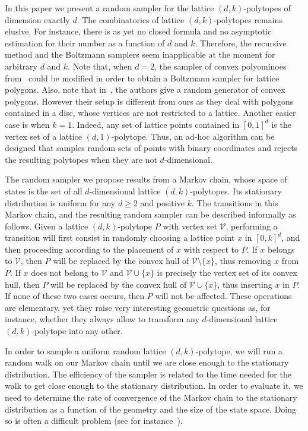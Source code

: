\documentclass[a4paper]{article}
\begin{document}
In this paper we present a random sampler for the lattice $(d,k)$-polytopes of dimension exactly $d$. The combinatorics of lattice $(d,k)$-polytopes remains elusive. For instance, there is as yet no closed formula and no asymptotic estimation for their number as a function of $d$ and $k$. Therefore, the recursive method and the Boltzmann samplers seem inapplicable at the moment for arbitrary $d$ and $k$. Note that, when $d=2$, the sampler of convex polyominoes from~\cite{bodini2013asymptotic} could be modified in order to obtain a Boltzmann sampler for lattice polygons. Also, note that in~\cite{devillers2014generator}, the authors give a random generator of convex polygons. However their setup is different from ours as they deal with polygons contained in a disc, whose vertices are not restricted to a lattice. Another easier case is when $k=1$. Indeed, any set of lattice points contained in $[0,1]^d$ is the vertex set of a lattice $(d,1)$-polytope. Thus, an ad-hoc algorithm can be designed that samples random sets of points with binary coordinates and rejects the resulting polytopes when they are not $d$-dimensional.

The random sampler we propose results from a Markov chain, whose space of states is the set of all $d$-dimensional lattice $(d,k)$-polytopes. Its stationary distribution is uniform for any $d\geq{2}$ and positive $k$. The transitions in this Markov chain, and the resulting random sampler can be described informally as follows. Given a lattice $(d,k)$-polytope $P$ with vertex set $\mathcal{V}$, performing a transition will first consist in randomly choosing a lattice point $x$ in $[0,k]^d$, and then proceeding according to the placement of $x$ with respect to $P$. If $x$ belongs to $\mathcal{V}$, then $P$ will be replaced by the convex hull of $\mathcal{V}\mathord{\setminus}\{x\}$, thus removing $x$ from $P$. If $x$ does not belong to $\mathcal{V}$ and $\mathcal{V}\cup\{x\}$
is precisely the vertex set of its convex hull, then $P$ will be replaced by the convex hull of $\mathcal{V}\cup\{x\}$, thus inserting $x$ in $P$. If none of these two cases occurs, then $P$ will not be affected. These operations are elementary, yet they raise very interesting geometric questions as, for instance, whether they always allow to transform any $d$-dimensional lattice $(d,k)$-polytope into any other.

In order to sample a uniform random lattice $(d,k)$-polytope, we will run a random walk on our Markov chain until we are close enough to the stationary distribution. The efficiency of the sampler is related to the time needed for the walk to get close enough to the stationary distribution. In order to evaluate it, we need to determine the rate of convergence of the Markov chain to the stationary distribution as a function of the geometry and the size of the state space. Doing so is often a difficult problem (see for instance~\cite{carnino2011random,melanccon2001random}).
\end{document}
